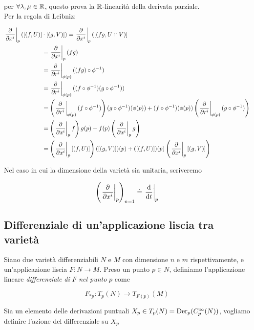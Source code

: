 per $ \forall \lambda,\mu \in \mathbb{R} $, questo prova la $ \mathbb{R} $-linearità della derivata parziale.\\
Per la regola di Leibniz:

\begin{align}
	\begin{split}
		\eval{ \pdv{x^{i}} }_{p} ([(f,U)]& \cdot [(g,V)]) = \eval{ \pdv{x^{i}} }_{p} ([(fg,U \cap V)]\\
		&= \eval{ \pdv{x^{i}} }_{p} (f g)\\
		&= \eval{ \pdv{r^{i}} }_{\phi(p)} ((f g) \circ \phi^{-1})\\
		&= \eval{ \pdv{r^{i}} }_{\phi(p)} ((f \circ \phi^{-1}) (g \circ \phi^{-1}))\\
		&= \left( \eval{ \pdv{r^{i}} }_{\phi(p)} (f \circ \phi^{-1}) \right) (g \circ \phi^{-1})(\phi(p)) + (f \circ \phi^{-1})(\phi(p)) \left( \eval{ \pdv{r^{i}} }_{\phi(p)} (g \circ \phi^{-1}) \right)\\
		&= \left( \eval{ \pdv{x^{i}} }_{p} f \right) g(p) + f(p) \left( \eval{ \pdv{x^{i}} }_{p} g \right)\\
		&= \left( \eval{ \pdv{x^{i}} }_{p} [(f,U)] \right) ([(g,V)])(p) + ([(f,U)])(p) \left( \eval{ \pdv{x^{i}} }_{p} [(g,V)] \right)
	\end{split}
\end{align}

Nel caso in cui la dimensione della varietà sia unitaria, scriveremo

\begin{equation}
	\left( \eval{ \pdv{x^{i}} }_{p} \right)_{n=1} \doteq \eval{ \dv{t} }_{p}
\end{equation}

\subsection{Differenziale di un'applicazione liscia tra varietà}

Siano due varietà differenziabili $ N $ e $ M $ con dimensione $ n $ e $ m $ rispettivamente, e un'applicazione liscia $ F : N \to M $. Preso un punto $ p \in N $, definiamo l'applicazione lineare \textit{differenziale di} $ F $ \textit{nel punto} $ p $ come

\begin{equation}
	F_{*p} : T_{p}(N) \to T_{F(p)}(M)
\end{equation}

Sia un elemento delle derivazioni puntuali $ X_{p} \in T_{p}(N) = \operatorname{Der}_{p}(C_{p}^{\infty}(N)) $, vogliamo definire l'azione del differenziale su $ X_{p} $

